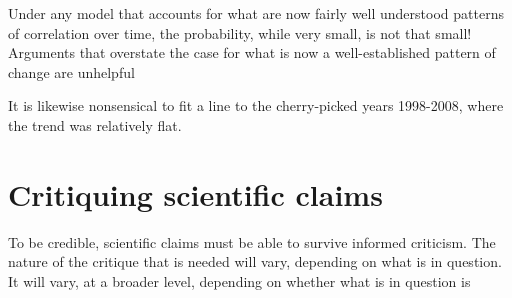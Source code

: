 \documentclass[
  10pt,
  b5paper]{book}
\begin{document}
Under any model that accounts for what are now
fairly well understood patterns of correlation over time,
the probability, while very small, is not that small!
Arguments that overstate the case for what is now a
well-established pattern of change are unhelpful

It is likewise nonsensical to fit a line to the cherry-picked
years 1998-2008, where the trend was relatively flat.

\hypertarget{critiquing-scientific-claims}{%
\chapter{Critiquing scientific claims}\label{critiquing-scientific-claims}}

To be credible, scientific claims must be able to survive
informed criticism. The nature of the critique that is
needed will vary, depending on what is in question.
It will vary, at a broader level, depending on whether
what is in question is
\end{document}
